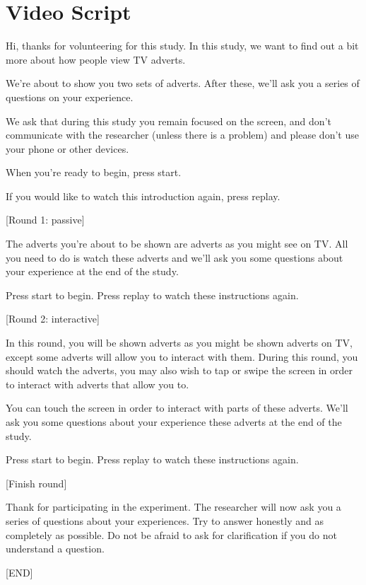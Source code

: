 \section{Video Script}
	\label{sec:appendix_video_script}
	Hi, thanks for volunteering for this study. In this study, we want to find out a bit more about how people view TV adverts. 

	We’re about to show you two sets of adverts. After these, we’ll ask you a series of questions on your experience.

	We ask that during this study you remain focused on the screen, and don’t communicate with the researcher (unless there is a problem) and please don’t use your phone or other devices.

	When you’re ready to begin, press start.

	If you would like to watch this introduction again, press replay.

	[Round 1: passive]

	The adverts you’re about to be shown are adverts as you might see on TV. All you need to do is watch these adverts and we’ll ask you some questions about your experience at the end of the study.

	Press start to begin.
	Press replay to watch these instructions again.

	[Round 2: interactive]

	In this round, you will be shown adverts as you might be shown adverts on TV, except some adverts will allow you to interact with them. During this round, you should watch the adverts, you may also wish to tap or swipe the screen in order to interact with adverts that allow you to. 

	You can touch the screen in order to interact with parts of these adverts. We’ll ask you some questions about your experience these adverts at the end of the study.

	Press start to begin.
	Press replay to watch these instructions again.

	[Finish round]

	Thank for participating in the experiment. The researcher will now ask you a series of questions about your experiences. Try to answer honestly and as completely as possible. Do not be afraid to ask for clarification if you do not understand a question.

	[END]
